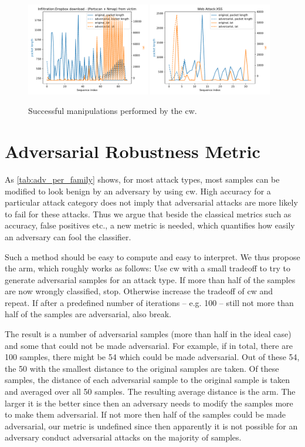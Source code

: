 \documentclass[conference]{IEEEtran}
\begin{document}
\begin{figure}[p]
\includegraphics[width=0.48\textwidth]{../plots/plot_adv/5.pdf}
\includegraphics[width=0.48\textwidth]{../plots/plot_adv/6.pdf}
\caption{Successful manipulations performed by the \gls{cw}.}
\label{adv_plots}
\end{figure}

\section{Adversarial Robustness Metric}

As \autoref{tab:adv_per_family} shows, for most attack types, most samples can be modified to look benign by an adversary by using \gls{cw}. High accuracy for a particular attack category does not imply that adversarial attacks are more likely to fail for these attacks. Thus we argue that beside the classical metrics such as accuracy, false positives etc., a new metric is needed, which quantifies how easily an adversary can fool the classifier. 

Such a method should be easy to compute and easy to interpret. We thus propose the \gls{arm}, which roughly works as follows: Use \gls{cw} with a small tradeoff to try to generate adversarial samples for an attack type. If more than half of the samples are now wrongly classified, stop. Otherwise increase the tradeoff of \gls{cw} and repeat. If after a predefined number of iterations -- e.g. 100 -- still not more than half of the samples are adversarial, also break. 

The result is a number of adversarial samples (more than half in the ideal case) and some that could not be made adversarial. For example, if in total, there are 100 samples, there might be 54 which could be made adversarial. Out of these 54, the 50 with the smallest distance to the original samples are taken. Of these samples, the distance of each adversarial sample to the original sample is taken and averaged over all 50 samples. The resulting average distance is the \gls{arm}. The larger it is the better since then an adversary needs to modify the samples more to make them adversarial. If not more then half of the samples could be made adversarial, our metric is undefined since then apparently it is not possible for an adversary conduct adversarial attacks on the majority of samples.
\end{document}
